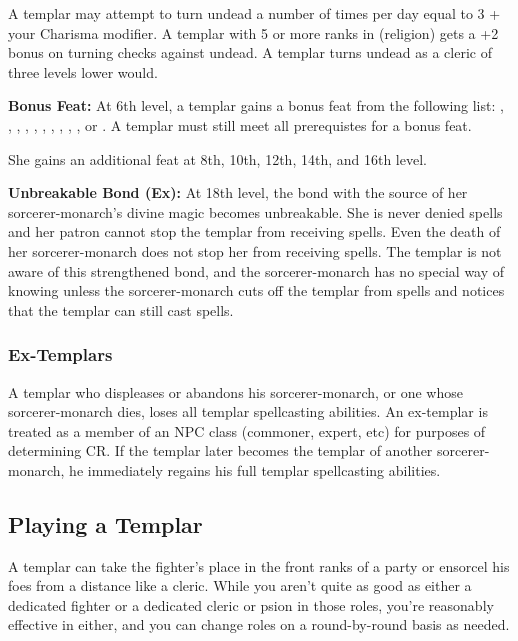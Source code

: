 A templar may attempt to turn undead a number of times per day equal to 3 + your Charisma modifier. A templar with 5 or more ranks in  (religion) gets a +2 bonus on turning checks against undead. A templar turns undead as a cleric of three levels lower would.

\textbf{Bonus Feat:} At 6th level, a templar gains a bonus feat from the following list:
,
,
,
,
,
,
,
,
,
,
or .
A templar must still meet all prerequistes for a bonus feat.

She gains an additional feat at 8th, 10th, 12th, 14th, and 16th level.


\textbf{Unbreakable Bond (Ex):} At 18th level, the bond with the source of her sorcerer-monarch's divine magic becomes unbreakable. She is never denied spells and her patron cannot stop the templar from receiving spells. Even the death of her sorcerer-monarch does not stop her from receiving spells. The templar is not aware of this strengthened bond, and the sorcerer-monarch has no special way of knowing unless the sorcerer-monarch cuts off the templar from spells and notices that the templar can still cast spells.



\subsubsection{Ex-Templars}
A templar who displeases or abandons his sorcerer-monarch, or one whose sorcerer-monarch dies, loses all templar spellcasting abilities. An ex-templar is treated as a member of an NPC class (commoner, expert, etc) for purposes of determining CR. If the templar later becomes the templar of another sorcerer-monarch, he immediately regains his full templar spellcasting abilities.



\subsection{Playing a Templar}
A templar can take the fighter's place in the front ranks of a party or ensorcel his foes from a distance like a cleric. While you aren't quite as good as either a dedicated fighter or a dedicated cleric or psion in those roles, you're reasonably effective in either, and you can change roles on a round-by-round basis as needed.

